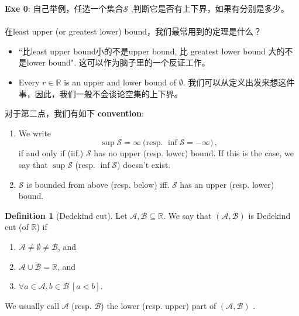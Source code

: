 \documentclass{book}
\theoremstyle{definition}
\newtheorem{definition}{Definition}[section]
\begin{document}
\noindent \textbf{Exe 0}: 自己举例，任选一个集合$\mathcal{S}$ ,判断它是否有上下界，如果有分别是多少。\\
~\\
在least upper (or greatest lower) bound，我们最常用到的定理是什么？ 
\begin{itemize}
    \item ``比least upper bound小的不是upper bound, 比 greatest lower bound 大的不是lower bound". 这可以作为脑子里的一个反证工作。
    \item Every $r\in\mathbb{R}$ is an upper and lower bound of $\emptyset$. 我们可以从定义出发来想这件事，因此，我们一般不会谈论空集的上下界。
\end{itemize}
对于第二点，我们有如下 \textbf{convention}: \\
\begin{enumerate}
    \item We write 
    \begin{equation}
        \sup \mathcal{S}=\infty
        ~\text{(resp. } \inf \mathcal{S} =-\infty \text{)}  \,,
    \end{equation}
    if and only if (iif.) $\mathcal{S}$ has no upper (resp. lower) bound. If this is the case, we say that $\sup \mathcal{S}$ (resp. $\inf \mathcal{S}$) doesn't exist.
    \item $\mathcal{S}$ is bounded from above (resp. below) iff. $\mathcal{S}$ has an upper (resp. lower) bound.
\end{enumerate}

\begin{definition}[Dedekind cut]
Let $\mathcal{A}, \mathcal{B} \subseteq \mathbb{R}$. We say that $(\mathcal{A}, \mathcal{B})$ is Dedekind cut (of $\mathbb{R}$) if
\begin{enumerate}
    \item $\mathcal{A} \neq \emptyset \neq \mathcal{B}$, and
    \item $\mathcal{A} \cup \mathcal{B} = \mathbb{R}$, and
    \item $\forall a \in \mathcal{A}, b \in \mathcal{B}~[a<b]$.
\end{enumerate}
We usually call $\mathcal{A}$ (resp. $\mathcal{B}$)  the lower (resp. upper) part of $(\mathcal{A}, \mathcal{B})$ .
\end{definition}
\end{document}
